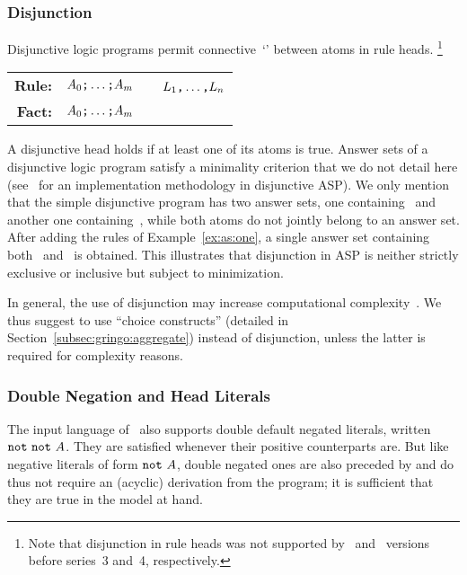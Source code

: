 \subsubsection{Disjunction}\label{subsec:gringo:disjunction}
Disjunctive logic programs permit connective~`\code{;}' between atoms in rule heads.%
\footnote{Note that disjunction in rule heads was not supported by \clasp\ and \clingo\ versions before series~3 and~4, respectively.}
\par
\medskip
\begin{tabular}{rl@{}l}\label{eq:disjunctive:rule}
\textbf{Rule:} & $A_0\text{\texttt{;}}\dots\text{\texttt{;}}A_m$&~\code{:-}~$L_1\text{\texttt{,}}\dots\text{\texttt{,}}L_n$\code{.}
\\
\textbf{Fact:} & $A_0\text{\texttt{;}}\dots\text{\texttt{;}}A_m$&\code{.}
\end{tabular}
\par
\medskip
\noindent
A disjunctive head holds if at least one of its atoms is true.
Answer sets of a disjunctive logic program satisfy a minimality criterion
that we do not detail here
(see~\cite{eitpol06a,gekasc11b} for an implementation methodology in disjunctive ASP).
We only mention that the simple disjunctive program  has two answer sets,
one containing~ and another one containing~,
while both atoms do not jointly belong to an answer set.
After adding the rules of Example~\ref{ex:as:one}, a single answer set containing both~ and~ is obtained.
This illustrates that disjunction in ASP is neither strictly exclusive or inclusive but subject to minimization.

In general, the use of disjunction may increase
computational complexity~\cite{eitgot95a}.
We thus suggest to use ``choice constructs'' (detailed in Section~\ref{subsec:gringo:aggregate})
instead of disjunction, unless the latter is required for complexity reasons.

\subsubsection{Double Negation and Head Literals}\label{subsec:gringo:double}

The input language of \gringo\ also supports double default negated literals,
written $\texttt{not}~\texttt{not}~A$.
They are satisfied whenever their positive counterparts are.
But like negative literals of form $\texttt{not}~A$,
double negated ones are also preceded by  and 
do thus not require an (acyclic) derivation from the program;
it is sufficient that they are true in the model at hand.

